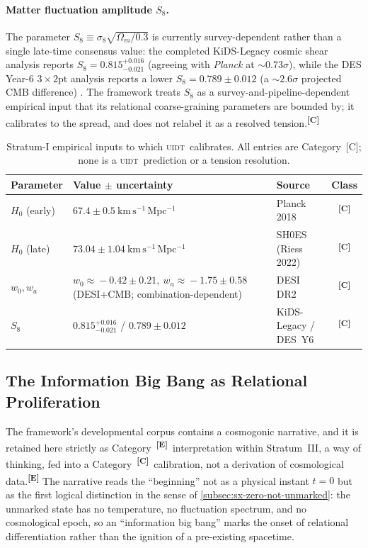 \documentclass[12pt,a4paper,twoside]{article}
\theoremstyle{plain}
\theoremstyle{definition}
\theoremstyle{remark}
\newcommand{\UIDT}{\textsc{uidt}}
\newcommand{\catmark}[1]{\textsuperscript{\textsf{\textbf{[#1]}}}}
\begin{document}
\paragraph{Matter fluctuation amplitude $S_8$.}
The parameter $S_8\equiv\sigma_8\sqrt{\Omega_m/0.3}$ is currently survey-dependent rather than a single late-time consensus value: the completed KiDS-Legacy cosmic shear analysis reports $S_8 = 0.815^{+0.016}_{-0.021}$ (agreeing with \textit{Planck} at $\sim 0.73\sigma$), while the DES Year-6 $3\times2$pt analysis reports a lower $S_8 = 0.789 \pm 0.012$ (a $\sim 2.6\sigma$ projected CMB difference) \cite{kids2025,des2026}. The framework treats $S_8$ as a survey-and-pipeline-dependent empirical input that its relational coarse-graining parameters are bounded by; it calibrates to the spread, and does not relabel it as a resolved tension.\catmark{C}

\begin{table}[H]
\centering
\footnotesize
\caption{Stratum-I empirical inputs to which \UIDT\ calibrates. All entries are
Category~[C]; none is a \UIDT\ prediction or a tension resolution.}
\label{tab:cosmology-inputs}
\renewcommand{\arraystretch}{1.3}
\begin{tabular}{p{} p{} p{} c}
\toprule
\textbf{Parameter} & \textbf{Value $\pm$ uncertainty} & \textbf{Source} & \textbf{Class} \\
\midrule
$H_0$ (early) & $67.4 \pm 0.5\ \mathrm{km\,s^{-1}\,Mpc^{-1}}$ & Planck 2018 & \catmark{C} \\
$H_0$ (late) & $73.04 \pm 1.04\ \mathrm{km\,s^{-1}\,Mpc^{-1}}$ & SH0ES (Riess 2022) & \catmark{C} \\
$w_0, w_a$ & $w_0\!\approx\!-0.42\pm0.21,\ w_a\!\approx\!-1.75\pm0.58$ (DESI+CMB; combination-dependent) & DESI DR2 & \catmark{C} \\
$S_8$ & $0.815^{+0.016}_{-0.021}$ / $0.789\pm0.012$ & KiDS-Legacy / DES~Y6 & \catmark{C} \\
\bottomrule
\end{tabular}
\end{table}

\subsection{The Information Big Bang as Relational Proliferation}
\label{subsec:information-big-bang}

The framework's developmental corpus contains a cosmogonic narrative, and it is retained here strictly as Category~\catmark{E}\ interpretation within Stratum~III, a way of thinking, fed into a Category~\catmark{C}\ calibration, not a derivation of cosmological data.\catmark{E} The narrative reads the ``beginning'' not as a physical instant $t=0$ but as the first logical distinction in the sense of \cref{subsec:sx-zero-not-unmarked}: the unmarked state has no temperature, no fluctuation spectrum, and no cosmological epoch, so an ``information big bang'' marks the onset of relational differentiation rather than the ignition of a pre-existing spacetime.
\end{document}
